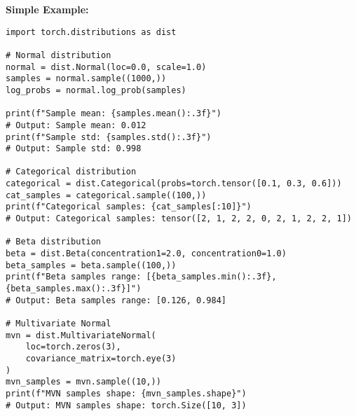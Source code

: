 \documentclass[11pt,a4paper]{book}
\begin{document}
\textbf{Simple Example:}
\begin{verbatim}
import torch.distributions as dist

# Normal distribution
normal = dist.Normal(loc=0.0, scale=1.0)
samples = normal.sample((1000,))
log_probs = normal.log_prob(samples)

print(f"Sample mean: {samples.mean():.3f}")
# Output: Sample mean: 0.012
print(f"Sample std: {samples.std():.3f}")
# Output: Sample std: 0.998

# Categorical distribution
categorical = dist.Categorical(probs=torch.tensor([0.1, 0.3, 0.6]))
cat_samples = categorical.sample((100,))
print(f"Categorical samples: {cat_samples[:10]}")
# Output: Categorical samples: tensor([2, 1, 2, 2, 0, 2, 1, 2, 2, 1])

# Beta distribution
beta = dist.Beta(concentration1=2.0, concentration0=1.0)
beta_samples = beta.sample((100,))
print(f"Beta samples range: [{beta_samples.min():.3f}, {beta_samples.max():.3f}]")
# Output: Beta samples range: [0.126, 0.984]

# Multivariate Normal
mvn = dist.MultivariateNormal(
    loc=torch.zeros(3),
    covariance_matrix=torch.eye(3)
)
mvn_samples = mvn.sample((10,))
print(f"MVN samples shape: {mvn_samples.shape}")
# Output: MVN samples shape: torch.Size([10, 3])
\end{verbatim}
\end{document}
